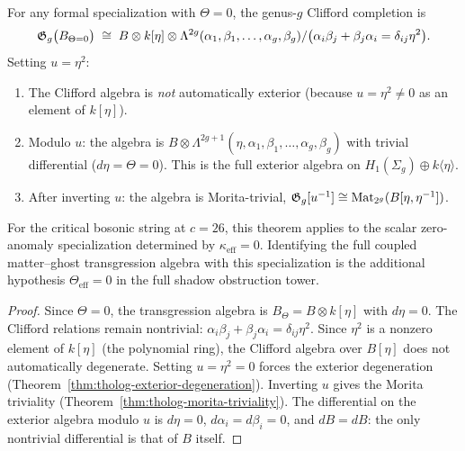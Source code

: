 \begin{theorem}
For any formal specialization with $\Theta = 0$,
the genus-$g$ Clifford completion is
\[
\mathfrak{G}_g\bigl(B_{\Theta=0}\bigr)
\;\cong\;
B \otimes k[\eta] \otimes \Lambda^{2g}(\alpha_1,\beta_1,\dots,\alpha_g,\beta_g)
/\bigl(\alpha_i\beta_j + \beta_j\alpha_i = \delta_{ij}\eta^2\bigr).
\]
Setting $u = \eta^2$:
\begin{enumerate}[label=\textup{(\roman*)}]
\item The Clifford algebra is \emph{not} automatically exterior
 (because $u = \eta^2 \neq 0$ as an element of $k[\eta]$).
\item Modulo $u$: the algebra is
 $B \otimes \Lambda^{2g+1}(\eta, \alpha_1, \beta_1, \dots,
 \alpha_g, \beta_g)$
 with trivial differential ($d\eta = \Theta = 0$).
 This is the full exterior algebra on $H_1(\Sigma_g) \oplus k\langle\eta\rangle$.
\item After inverting $u$: the algebra is Morita-trivial,
 $\mathfrak{G}_g[u^{-1}] \cong \operatorname{Mat}_{2^g}(B[\eta, \eta^{-1}])$.
\end{enumerate}
For the critical bosonic string at $c = 26$, this theorem applies to
the scalar zero-anomaly specialization determined by
\(\kappa_{\mathrm{eff}}=0\). Identifying the full coupled
matter--ghost transgression algebra with this specialization is the
additional hypothesis \(\Theta_{\mathrm{eff}}=0\) in the full shadow
obstruction tower.
\end{theorem}

\begin{proof}
Since $\Theta = 0$, the transgression algebra is
$B_\Theta = B \otimes k[\eta]$ with $d\eta = 0$.
The Clifford relations remain nontrivial:
$\alpha_i\beta_j + \beta_j\alpha_i = \delta_{ij}\eta^2$.
Since $\eta^2$ is a nonzero element of $k[\eta]$
(the polynomial ring), the Clifford algebra over
$B[\eta]$ does not automatically degenerate.
Setting $u = \eta^2 = 0$ forces the exterior degeneration
(Theorem~\ref{thm:tholog-exterior-degeneration}).
Inverting $u$ gives the Morita triviality
(Theorem~\ref{thm:tholog-morita-triviality}).
The differential on the exterior algebra modulo $u$ is
$d\eta = 0$, $d\alpha_i = d\beta_i = 0$, and $dB = dB$:
the only nontrivial differential is that of $B$ itself.
\end{proof}


